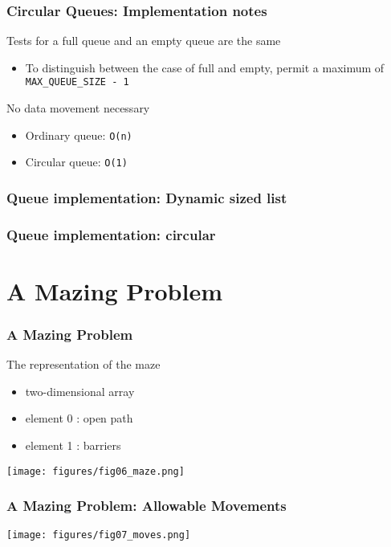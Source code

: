 \documentclass[newPxFont,sthlmFooter,nooffset]{beamer}
\begin{document}
\begin{frame}[t]
  \frametitle{Circular Queues: Implementation notes}
Tests for a full queue and an empty queue are the same
\begin{itemize}
\item To distinguish between the case of full and empty, permit a maximum of \texttt{MAX\_QUEUE\_SIZE - 1}
\end{itemize}
\bigskip
No data movement necessary
\begin{itemize}
\item Ordinary queue: \texttt{O(n)}
\item Circular queue: \texttt{O(1)}
\end{itemize}

\end{frame}

\begin{frame}
  \frametitle{Queue implementation: Dynamic sized list}

  

\end{frame}

\begin{frame}
  \frametitle{Queue implementation: circular}

  

\end{frame}


\section{A Mazing Problem}
\begin{frame}[t]
  \frametitle{A Mazing Problem}
The representation of the maze
\begin{itemize}
\item two-dimensional array
\item element 0 : open path
\item element 1 : barriers
\end{itemize}
\texttt{[image: figures/fig06\_maze.png]}
\end{frame}

\begin{frame}[t]
  \frametitle{A Mazing Problem: Allowable Movements}
\texttt{[image: figures/fig07\_moves.png]}
\end{frame}
\end{document}
